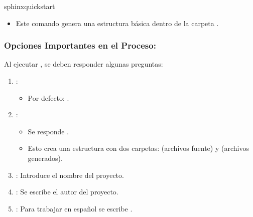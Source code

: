 \documentclass[a4paper,10pt,spanish]{sphinxmanual}
\begin{document}
\begin{sphinxVerbatim}[commandchars=\\\{\}]
sphinx\PYGZhy{}quickstart
\end{sphinxVerbatim}
\begin{itemize}
\item {} 
\sphinxAtStartPar
Este comando genera una estructura básica dentro de la carpeta .

\end{itemize}


\subsubsection{Opciones Importantes en el Proceso:}
\label{\detokenize{configuracion_inicial/003.Creacion_proyecto_Sphinx:opciones-importantes-en-el-proceso}}
\sphinxAtStartPar
Al ejecutar , se deben responder algunas preguntas:
\begin{enumerate}
%
\item {} 
\sphinxAtStartPar
{}:
\begin{itemize}
\item {} 
\sphinxAtStartPar
Por defecto: .

\end{itemize}

\item {} 
\sphinxAtStartPar
{}:
\begin{itemize}
\item {} 
\sphinxAtStartPar
Se responde .

\item {} 
\sphinxAtStartPar
Esto crea una estructura con dos carpetas:  (archivos fuente) y  (archivos generados).

\end{itemize}

\item {} 
\sphinxAtStartPar
{}: Introduce el nombre del proyecto.

\item {} 
\sphinxAtStartPar
{}: Se escribe el autor del proyecto.

\item {} 
\sphinxAtStartPar
{}:  Para trabajar en español se escribe .

\end{enumerate}
\end{document}
